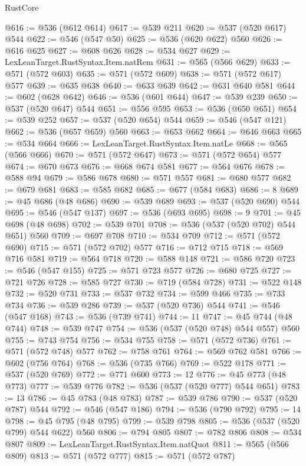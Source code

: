 \begin{lexlean}{RustCore}
\begin{coremodule}
@616 := @536 (@612 @614)
@617 := @539 @211
@620 := @537 (@520 @617) @544
@622 := @546 (@547 @50)
@625 := @536 (@620 @622) @560
@626 := @616 @625
@627 := @608 @626
@628 := @534 @627
@629 := LexLeanTarget.RustSyntax.Item.natRem
@631 := @565 (@566 @629)
@633 := @571 (@572 @603)
@635 := @571 (@572 @609)
@638 := @571 (@572 @617) @577
@639 := @635 @638
@640 := @633 @639
@642 := @631 @640 @581
@644 := @602 (@628 @642)
@646 := @536 (@601 @644)
@647 := @539 @239
@650 := @537 (@520 @647) @544
@651 := @556 @595
@653 := @536 (@650 @651)
@654 := @539 @252
@657 := @537 (@520 @654) @544
@659 := @546 (@547 @121)
@662 := @536 (@657 @659) @560
@663 := @653 @662
@664 := @646 @663
@665 := @534 @664
@666 := LexLeanTarget.RustSyntax.Item.natLe
@668 := @565 (@566 @666)
@670 := @571 (@572 @647)
@673 := @571 (@572 @654) @577
@674 := @670 @673
@676 := @668 @674 @581
@677 := @564 @676
@678 := @588 @94
@679 := @586 @678
@680 := @571 @557
@681 := @680 @577
@682 := @679 @681
@683 := @585 @682
@685 := @677 (@584 @683)
@686 := 8
@689 := @45 @686 (@48 @686)
@690 := @539 @689
@693 := @537 (@520 @690) @544
@695 := @546 (@547 @137)
@697 := @536 (@693 @695)
@698 := 9
@701 := @45 @698 (@48 @698)
@702 := @539 @701
@708 := @536 (@537 (@520 @702) @544 @651) @560
@709 := @697 @708
@710 := @534 @709
@712 := @571 (@572 @690)
@715 := @571 (@572 @702) @577
@716 := @712 @715
@718 := @569 @716 @581
@719 := @564 @718
@720 := @588 @148
@721 := @586 @720
@723 := @546 (@547 @155)
@725 := @571 @723 @577
@726 := @680 @725
@727 := @721 @726
@728 := @585 @727
@730 := @719 (@584 @728)
@731 := @522 @148
@732 := @520 @731
@733 := @537 @732
@734 := @599 @466
@735 := @733 @734
@736 := @539 @286
@739 := @537 (@520 @736) @544
@741 := @546 (@547 @168)
@743 := @536 (@739 @741)
@744 := 11
@747 := @45 @744 (@48 @744)
@748 := @539 @747
@754 := @536 (@537 (@520 @748) @544 @557) @560
@755 := @743 @754
@756 := @534 @755
@758 := @571 (@572 @736)
@761 := @571 (@572 @748) @577
@762 := @758 @761
@764 := @569 @762 @581
@766 := @602 (@756 @764)
@768 := @536 (@735 @766)
@769 := @522 @178
@771 := @537 (@520 @769)
@772 := @771 @600
@773 := 12
@776 := @45 @773 (@48 @773)
@777 := @539 @776
@782 := @536 (@537 (@520 @777) @544 @651)
@783 := 13
@786 := @45 @783 (@48 @783)
@787 := @539 @786
@790 := @537 (@520 @787) @544
@792 := @546 (@547 @186)
@794 := @536 (@790 @792)
@795 := 14
@798 := @45 @795 (@48 @795)
@799 := @539 @798
@805 := @536 (@537 (@520 @799) @544 @622) @560
@806 := @794 @805
@807 := @782 @806
@808 := @534 @807
@809 := LexLeanTarget.RustSyntax.Item.natQuot
@811 := @565 (@566 @809)
@813 := @571 (@572 @777)
@815 := @571 (@572 @787)

\end{coremodule}
\end{lexlean}
